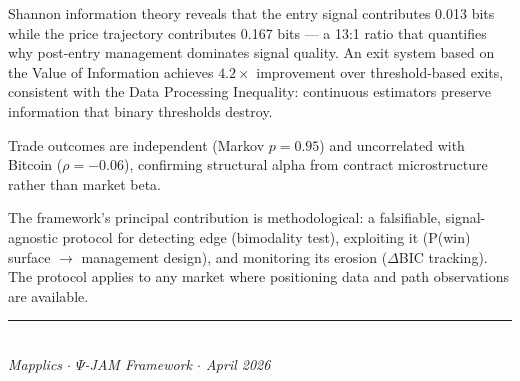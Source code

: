 \documentclass[11pt,a4paper]{article}
\begin{document}
Shannon information theory reveals that the entry signal contributes 0.013 bits while the price trajectory contributes 0.167 bits --- a 13:1 ratio that quantifies why post-entry management dominates signal quality. An exit system based on the Value of Information achieves $4.2\times$ improvement over threshold-based exits, consistent with the Data Processing Inequality: continuous estimators preserve information that binary thresholds destroy.

Trade outcomes are independent (Markov $p = 0.95$) and uncorrelated with Bitcoin ($\rho = -0.06$), confirming structural alpha from contract microstructure rather than market beta.

The framework's principal contribution is methodological: a falsifiable, signal-agnostic protocol for detecting edge (bimodality test), exploiting it (P(win) surface $\to$ management design), and monitoring its erosion ($\Delta$BIC tracking). The protocol applies to any market where positioning data and path observations are available.

\vfill
\begin{center}
\rule{0.5\textwidth}{0.4pt}\\[6pt]
{\small\itshape Mapplics $\cdot$ $\Psi$-JAM Framework $\cdot$ April 2026}
\end{center}
\end{document}
